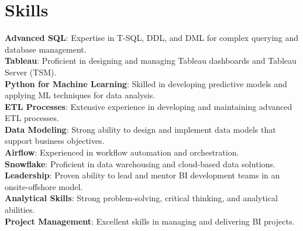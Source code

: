 \section{Skills}
  \begin{itemize}[leftmargin=0.1in, label={}]
    \normalsize{\item{
      \textbf{Advanced SQL}: Expertise in T-SQL, DDL, and DML for complex querying and database management. \\
      \textbf{Tableau}: Proficient in designing and managing Tableau dashboards and Tableau Server (TSM). \\
      \textbf{Python for Machine Learning}: Skilled in developing predictive models and applying ML techniques for data analysis. \\
      \textbf{ETL Processes}: Extensive experience in developing and maintaining advanced ETL processes. \\
      \textbf{Data Modeling}: Strong ability to design and implement data models that support business objectives. \\
      \textbf{Airflow}: Experienced in workflow automation and orchestration. \\
      \textbf{Snowflake}: Proficient in data warehousing and cloud-based data solutions. \\
      \textbf{Leadership}: Proven ability to lead and mentor BI development teams in an onsite-offshore model. \\
      \textbf{Analytical Skills}: Strong problem-solving, critical thinking, and analytical abilities. \\
      \textbf{Project Management}: Excellent skills in managing and delivering BI projects. \\
     }}
  \end{itemize}
